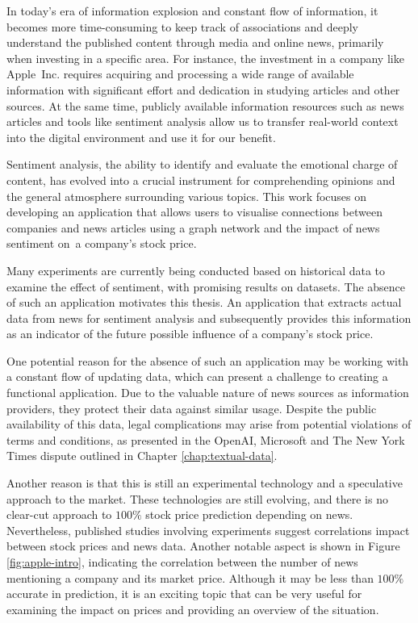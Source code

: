

In today's era of information explosion and constant flow of information, it becomes more time-consuming to keep track of associations and deeply understand the published content through media and online news, primarily when investing in a specific area. For instance, the investment in a company like Apple~Inc. requires acquiring and processing a wide range of available information with significant effort and dedication in studying articles and other sources. At the same time, publicly available information resources such as news articles and tools like sentiment analysis allow us to transfer real-world context into the digital environment and use it for our benefit.

Sentiment analysis, the ability to identify and evaluate the emotional charge of content, has evolved into a crucial instrument for comprehending opinions and the general atmosphere surrounding various topics. This work focuses on developing an application that allows users to visualise connections between companies and news articles using a graph network and the impact of news sentiment on~a company's stock price.

Many experiments are currently being conducted based on historical data to examine the effect of sentiment, with promising results on datasets. The absence of such an application motivates this thesis. An application that extracts actual data from news for sentiment analysis and subsequently provides this information as an indicator of the future possible influence of a company's stock price.

One potential reason for the absence of such an application may be working with a constant flow of updating data, which can present a challenge to creating a functional application. Due to the valuable nature of news sources as information providers, they protect their data against similar usage. Despite the public availability of this data, legal complications may arise from potential violations of terms and conditions, as presented in the OpenAI, Microsoft and The New York Times dispute outlined in Chapter \ref{chap:textual-data}.

Another reason is that this is still an experimental technology and a speculative approach to the market. These technologies are still evolving, and there is no clear-cut approach to $100\%$ stock price prediction depending on news. Nevertheless, published studies involving experiments suggest correlations impact between stock prices and news data. Another notable aspect is shown in Figure \ref{fig:apple-intro}, indicating the correlation between the number of news mentioning a company and its market price. Although it may be less than $100\%$ accurate in prediction, it is an exciting topic that can be very useful for examining the impact on prices and providing an overview of the situation.
 
